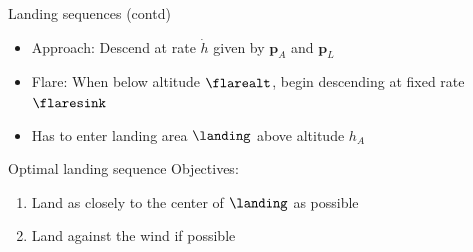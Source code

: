 \documentclass{beamer}
\renewcommand{\vec}[1]{
    \boldsymbol{#1}
}
\begin{document}
\begin{frame}{Landing sequences (contd)}
    \begin{itemize}
        \item Approach: Descend at rate $\dot{h}$ given by $\vec{p}_A$ and $\vec{p}_L$
        \item Flare: When below altitude $\flarealt$, begin descending at fixed rate $\flaresink$
        \item Has to enter landing area $\landing$ above altitude $h_A$
    \end{itemize}
\end{frame}

\begin{frame}{Optimal landing sequence}
    Objectives:
    \begin{enumerate}
        \item Land as closely to the center of $\landing$ as possible
        \item Land against the wind if possible
    \end{enumerate}
\end{frame}
\end{document}
